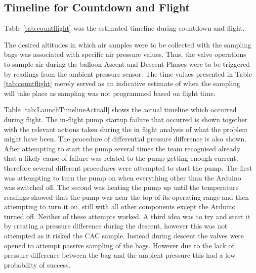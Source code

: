 \subsection{Timeline for Countdown and Flight}
Table \ref{tab:countflight} was the estimated timeline during countdown and flight. 

The desired altitudes in which air samples were to be collected with the sampling bags was associated with specific air pressure values. Thus, the valve operations to sample air during the balloon Ascent and Descent Phases were to be triggered by readings from the ambient pressure sensor. The time values presented in Table \ref{tab:countflight} merely served as an indicative estimate of when the sampling will take place as sampling was not programmed based on flight time.



Table \ref{tab:LaunchTimelineActuall} shows the actual timeline which occurred during flight. The in-flight pump startup failure that occurred is shown together with the relevant actions taken during the in flight analysis of what the problem might have been. The procedure of differential pressure difference is also shown. After attempting to start the pump several times the team recognised already that a likely cause of failure was related to the pump getting enough current, therefore several different procedures were attempted to start the pump. The first was attempting to turn the pump on when everything other than the Arduino was switched off. The second was heating the pump up until the temperature readings showed that the pump was near the top of its operating range and then attempting to turn it on, still with all other components except the Arduino turned off. Neither of these attempts worked. A third idea was to try and start it by creating a pressure difference during the descent, however this was not attempted as it risked the CAC sample. Instead during descent the valves were opened to attempt passive sampling of the bags. However due to the lack of pressure difference between the bag and the ambient pressure this had a low probability of success. 

